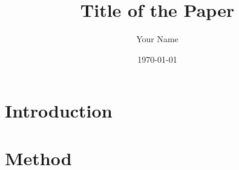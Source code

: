 \documentclass[11pt]{article}
\title{Title of the Paper}
\author{Your Name}
\date{\today}
\begin{document}
\maketitle

\begin{abstract}
\end{abstract}

\section{Introduction}\label{sec:intro}

\section{Method}\label{sec:method}

\end{document}
